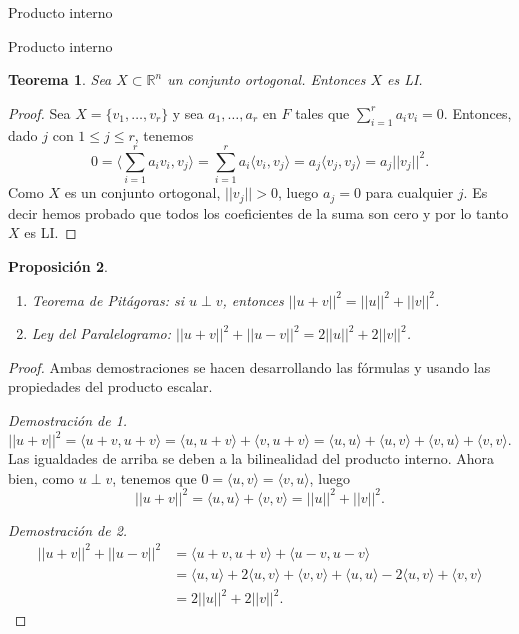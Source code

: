 \documentclass[a4paper,12pt,twoside,spanish,reqno]{amsbook}
\numberwithin{equation}{section}
\newtheorem{teorema}{Teorema}[section]
\newtheorem{proposicion}[teorema]{Proposici\'on}
\theoremstyle{definition}
\theoremstyle{remark}
\newcommand{\la}{\langle}
\newcommand{\ra}{\rangle}
\newcommand{\R}{\mathbb R}
\begin{document}
\begin{chapter}{Producto interno}
\begin{section}{Producto interno}
        \begin{teorema}\label{th-ortogonal-implica-li} Sea $X \subset \R^n$ un conjunto  ortogonal. Entonces $X$ es LI. 
        \end{teorema}
        \begin{proof} Sea $X =\{v_1,\ldots,v_r \}$ y sea $a_1,\ldots,a_r$ en $F$ tales que  $\sum_{i=1}^r a_iv_i =0$. Entonces,  dado $j$ con $1 \le j \le r$,  tenemos 
            $$
            0=\la\sum_{i=1}^r a_iv_i ,v_j \ra = \sum_{i=1}^r a_i\la v_i ,v_j \ra = a_j\la v_j ,v_j \ra = a_j||v_j||^2.
            $$
            Como $X$  es un conjunto ortogonal,  $||v_j|| >0$, luego $a_j =0$ para cualquier $j$. Es decir hemos probado que todos los coeficientes de la suma son cero y por lo tanto $X$  es LI.
        \end{proof}
        
        
        
        \begin{proposicion}
            ${}^{}$
            \begin{enumerate}
                \item Teorema de Pitágoras: si $u\perp v$, entonces $||u+v||^2 = ||u||^2 + ||v||^2$.
                \item Ley del Paralelogramo: $||u+v||^2+ ||u-v||^2 = 2||u||^2 + 2||v||^2$.
            \end{enumerate}
        \end{proposicion}
        \begin{proof} Ambas demostraciones se hacen desarrollando las fórmulas y usando las propiedades del producto escalar.
            
            \textit{Demostración de 1.}
            \begin{equation*}
            ||u+v||^2 = \la u+v, u+v\ra = \la u, u+v\ra+\la v, u+v\ra = \la u, u\ra+\la u, v\ra+\la v, u\ra+\la v, v\ra.
            \end{equation*} 
            Las igualdades de arriba se deben a la bilinealidad del producto interno. 
            Ahora bien,  como $u\perp v$,  tenemos que $0 = \la u, v\ra=\la v, u\ra$, luego
            \begin{equation*}
            ||u+v||^2 = \la u, u\ra+ \la v, v\ra =  ||u||^2 + ||v||^2.
            \end{equation*} 
            
            \textit{Demostración de 2.}
            \begin{align*}
            ||u+v||^2+ ||u-v||^2 &= \la u+v, u+v\ra + \la u-v, u-v\ra \\
            &= \la u, u\ra+2\la u, v\ra+\la v, v\ra + \la u, u\ra-2\la u, v\ra+\la v, v\ra \\
            &=  2||u||^2 + 2||v||^2.
            \end{align*}
        \end{proof}
        

\end{section}
\end{chapter}
\end{document}
